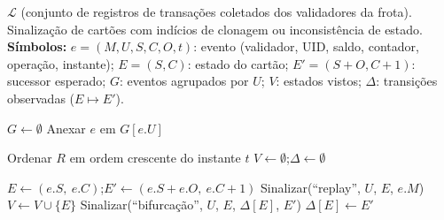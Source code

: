 
\begin{algorithm}[htbp]
  \small
  \algrenewcommand{}
  \algrenewcommand{}
  \algrenewcommand{}
  \algrenewcommand{}
  \algrenewcommand{}
  \algrenewcommand{}
  \algrenewcommand{}
  \algrenewcommand{}
  \algrenewcommand{}
  \algrenewcommand{}
  \algrenewcommand{}
  \algrenewcommand{}

  \caption{Reconciliação centralizada de registros e detecção de divergências entre sessões.}
  \label{alg:detection}
  \begin{algorithmic}[1]
    \Require $\mathcal{L}$ (conjunto de registros de transações coletados dos validadores da frota).
    \Ensure Sinalização de cartões com indícios de clonagem ou inconsistência de estado.
    \Statex \textbf{Símbolos:} $e = (M, U, S, C, O, t)$: evento (validador, UID, saldo, contador, operação, instante);\; $E = (S, C)$: estado do cartão;\; $E' = (S + O, C + 1)$: sucessor esperado;\; $G$: eventos agrupados por $U$;\; $V$: estados vistos;\; $\Delta$: transições observadas ($E \mapsto E'$).
    \Statex

      \State $G \gets \emptyset$ 
          \State Anexar $e$ em $G[e.U]$
        \EndFor
      \EndFor

        \State Ordenar $R$ em ordem crescente do instante $t$
        \State $V \gets \emptyset$;\quad $\Delta \gets \emptyset$

         
          \State $E \gets (e.S,\ e.C)$;\quad $E' \gets (e.S + e.O,\ e.C + 1)$
            \State Sinalizar(``replay'', $U$, $E$, $e.M$)
          \EndIf
          \State $V \gets V \cup \{E\}$
            \State Sinalizar(``bifurcação'', $U$, $E$, $\Delta[E]$, $E'$)
          \Else
            \State $\Delta[E] \gets E'$
          \EndIf
        \EndFor


\end{algorithmic}
\end{algorithm}
